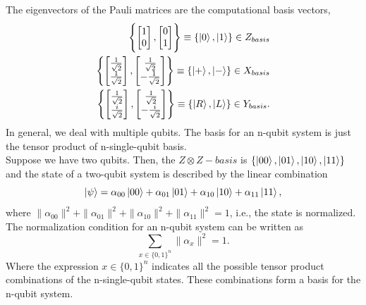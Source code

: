 The eigenvectors of the Pauli matrices are the computational basis vectors,
\begin{align*}
    \Biggl\{\begin{bmatrix}
           1 \\
           0 
         \end{bmatrix}, \begin{bmatrix}
           0 \\
           1 
         \end{bmatrix} \Biggr\}\equiv \{\ket{0}, \ket{1}\} \in Z_{basis} \\
         \Biggl\{\begin{bmatrix}
           \frac{1}{\sqrt{2}} \\
           \frac{1}{\sqrt{2}} 
         \end{bmatrix}, \begin{bmatrix}
           \frac{1}{\sqrt{2}} \\
           -\frac{1}{\sqrt{2}} 
         \end{bmatrix} \Biggr\}\equiv \{\ket{+}, \ket{-}\} \in X_{basis} \\
         \Biggl\{\begin{bmatrix}
           \frac{1}{\sqrt{2}} \\
           \frac{i}{\sqrt{2}} 
         \end{bmatrix}, \begin{bmatrix}
           \frac{1}{\sqrt{2}} \\
           -\frac{i}{\sqrt{2}} 
         \end{bmatrix} \Biggr\}\equiv \{\ket{R}, \ket{L}\} \in Y_{basis}.
\end{align*}
In general, we deal with multiple qubits. The basis for an n-qubit system is just the tensor product of n-single-qubit basis.\\
Suppose we have two qubits. Then, the $Z\otimes Z-basis$ is $\{\ket{00},\ket{01},\ket{10},\ket{11}\}$ and the state of a two-qubit system is described by the linear combination
\begin{equation}
    \ket{\psi} = \alpha_{00}\ket{00} +\alpha_{01}\ket{01} +\alpha_{10}\ket{10} +\alpha_{11}\ket{11},
\end{equation}
where $\|\alpha_{00}\|^{2} + \|\alpha_{01}\|^{2} + \|\alpha_{10}\|^{2} + \|\alpha_{11}\|^{2} = 1$, i.e., the state is normalized.\\
The normalization condition for an n-qubit system can be written as
\begin{equation}
\sum_{x\in \{0,1\}^{n}}\|\alpha_{x}\|^{2} = 1.
\end{equation}
Where the expression $x \in \{0,1\}^{n}$ indicates all the possible tensor product combinations of the n-single-qubit states. These combinations form a basis for the n-qubit system.
